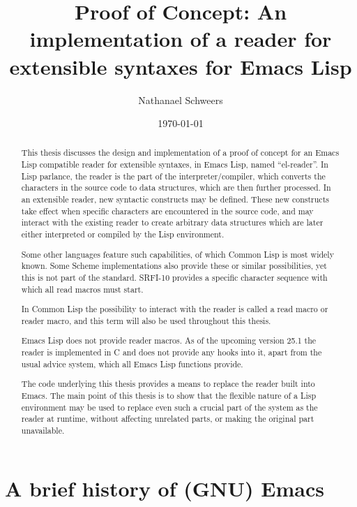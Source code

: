 \documentclass[a4paper,10pt,twoside]{report}
\author{Nathanael Schweers}
\date{\today}
\title{Proof of Concept: An implementation of a reader for extensible syntaxes for Emacs Lisp}
\newcommand{\el}{Emacs Lisp}
\newcommand{\cl}{Common Lisp}
\newcommand{\elr}{el-reader}
\begin{document}
\maketitle
\tableofcontents

\begin{abstract}
  This thesis discusses the design and implementation of a proof of concept for
  an \el{} compatible reader for extensible syntaxes, in \el{}, named
  ``\elr{}''.  In Lisp parlance, the reader is the part of the
  interpreter/compiler, which converts the characters in the source code to data
  structures, which are then further processed.  In an extensible reader, new
  syntactic constructs may be defined.  These new constructs take effect when
  specific characters are encountered in the source code, and may interact with
  the existing reader to create arbitrary data structures which are later either
  interpreted or compiled by the Lisp environment.

  Some other languages feature such capabilities, of which \cl{} is most widely
  known.  Some Scheme implementations also provide these or similar
  possibilities, yet this is not part of the standard.  SRFI-10 provides a
  specific character sequence with which all read macros must
  start. \cite{srfi-10}

  In \cl{} the possibility to interact with the reader is called a read macro or
  reader macro, and this term will also be used throughout this thesis.

  \el{} does not provide reader macros.  As of the upcoming version 25.1 the
  reader is implemented in C and does not provide any hooks into it, apart from
  the usual advice system, which all \el{} functions provide.

  The code underlying this thesis provides a means to replace the reader built
  into Emacs.  The main point of this thesis is to show that the flexible nature
  of a Lisp environment may be used to replace even such a crucial part of the
  system as the reader at runtime, without affecting unrelated parts, or making
  the original part unavailable.
\end{abstract}

\chapter{A brief history of (GNU) Emacs}
\label{sec:emacs-intro}
\end{document}
